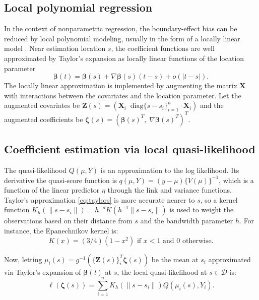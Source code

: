 \documentclass[authoryear,review, 12pt]{elsarticle}
\begin{document}
\subsection{Local polynomial regression}
In the context of nonparametric regression, the boundary-effect bias
can be reduced by local polynomial modeling, usually in the form of
a locally linear model \citep{Fan-Gijbels-1996}. Near estimation location $s$, the coefficient functions are well approximated by Taylor's expansion as locally linear functions of the location parameter
\begin{equation}\label{eq:taylors}
\bm{\beta}(t) = \bm{\beta}(s) + \nabla \bm{\beta}(s) (t - s) + o(|t - s|).
\end{equation}
The locally linear approximation is implemented by augmenting the matrix $\bm{X}$ with interactions between the covariates and the location parameter. Let the augmented covariates be $\bm{Z}(s) = \left( \bm{X}_i \;\; \text{diag}\{s-s_i\}_{i=1}^{n} \cdot\bm{X}_i \right)$ and the augmented coefficients be $\bm{\zeta}(s) = (\bm{\beta}(s)^T, \; \nabla \bm{\beta}(s)^T)^T$.

\subsection{Coefficient estimation via local quasi-likelihood}
The quasi-likelihood $Q(\mu, Y)$ is an approximation to the log likelihood. Its derivative the quasi-score function is $q(\mu, Y) = (y-\mu) \{V(\mu)\}^{-1}$, which is a function of the linear predictor $\eta$ through the link and variance functions. Taylor's approximation \eqref{eq:taylors} is more accurate nearer to $s$, so a kernel function $K_{h}(\|s-s_{i}\|) = h^{-d} K(h^{-1} \|s - s_i \| )$ is used to weight the observations based on their distance from $s$ and the bandwidth parameter $h$. For instance, the Epanechnikov kernel is:
\begin{equation}
K(x)=(3/4)(1-x^{2}) \text{ if } x<1 \text{ and } 0 \text{ otherwise}.
\end{equation}

Now, letting $\mu_i(s) = g^{-1} \left( \{\bm{Z}(s)\}^T_i \bm{\zeta}(s) \right)$ be the mean at $s_i$ approximated via Taylor's expansion of $\bm{\beta}(t)$ at $s$, the 
local quasi-likelihood at $s\in\mathcal{D}$ is:
\begin{equation}
\mathcal{\ell} \left(\bm{\zeta}(s)\right) = \sum_{i=1}^{n} K_{h} (\|s - s_i\|) Q \left(\mu_i(s) ,Y_i \right).\label{eq:local-quasi-likelihood}
\end{equation}
\end{document}
